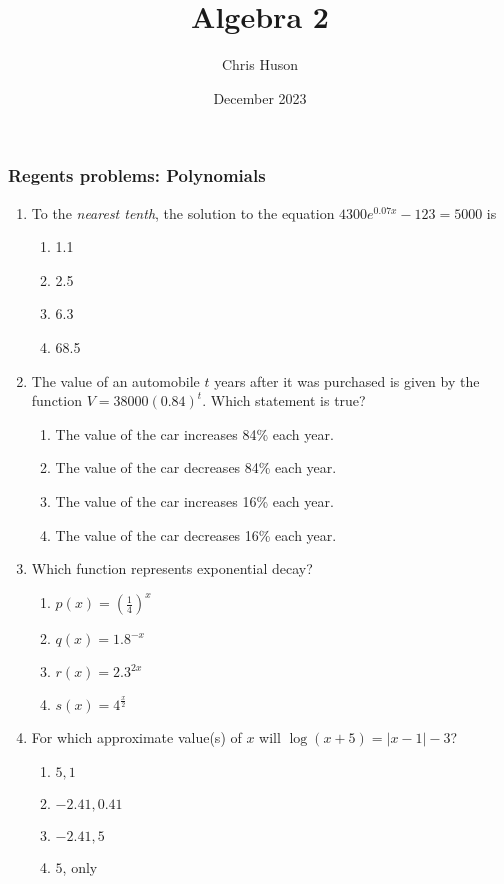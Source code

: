 \documentclass[12pt, twoside]{article}
\title{Algebra 2}
\author{Chris Huson}
\date{December 2023}
\begin{document}
\subsubsection*{Regents problems: Polynomials}
\begin{enumerate}[itemsep=0.5cm]
\item To the \emph{nearest tenth}, the solution to the equation $4300e^{0.07x} -123 = 5000$ is %
\begin{enumerate}
    \item 1.1
    \item 2.5
    \item 6.3
    \item 68.5
\end{enumerate}

\item The value of an automobile $t$ years after it was purchased is given by the function $V = 38000(0.84)^t$. Which statement is true? %
\begin{enumerate}
    \item The value of the car increases 84\% each year.
    \item The value of the car decreases 84\% each year.
    \item The value of the car increases 16\% each year.
    \item The value of the car decreases 16\% each year.
\end{enumerate}

\item Which function represents exponential decay? %
\begin{enumerate}
    \item $\displaystyle p(x) = \left(\frac{1}{4}\right)^x$
    \item $q(x) = 1.8^{-x}$
    \item $r(x) = 2.3^{2x}$
    \item $s(x) = 4^{\frac{x}{2}}$
\end{enumerate}

\item For which approximate value(s) of $x$ will $\log(x+5) = |x-1|-3$? %
\begin{enumerate}
    \item $5,1$
    \item $-2.41, 0.41$
    \item $-2.41, 5$
    \item $5$, only
\end{enumerate}


\end{enumerate}
\end{document}
